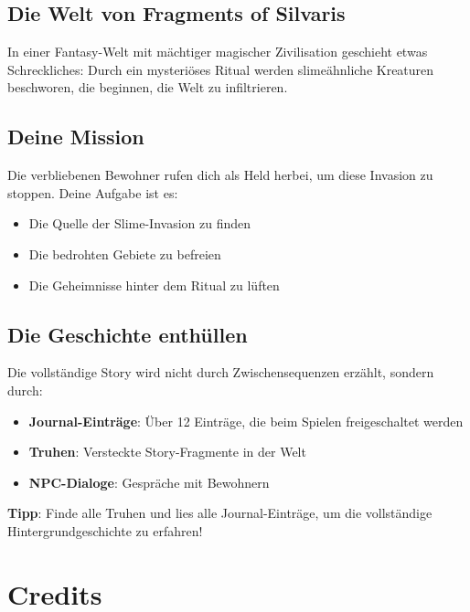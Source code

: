 \documentclass[
  a4paper,
  11pt,
  ngerman,
  parskip=half,
  bibliography=totoc,
  listof=totoc
]{scrreprt}
\begin{document}
\section{Die Welt von Fragments of Silvaris}

In einer Fantasy-Welt mit mächtiger magischer Zivilisation geschieht etwas Schreckliches: Durch ein mysteriöses Ritual werden slimeähnliche Kreaturen beschworen, die beginnen, die Welt zu infiltrieren.

\section{Deine Mission}

Die verbliebenen Bewohner rufen dich als Held herbei, um diese Invasion zu stoppen. Deine Aufgabe ist es:
\begin{itemize}
    \item Die Quelle der Slime-Invasion zu finden
    \item Die bedrohten Gebiete zu befreien
    \item Die Geheimnisse hinter dem Ritual zu lüften
\end{itemize}

\section{Die Geschichte enthüllen}

Die vollständige Story wird nicht durch Zwischensequenzen erzählt, sondern durch:
\begin{itemize}
    \item \textbf{Journal-Einträge}: Über 12 Einträge, die beim Spielen freigeschaltet werden
    \item \textbf{Truhen}: Versteckte Story-Fragmente in der Welt
    \item \textbf{NPC-Dialoge}: Gespräche mit Bewohnern
\end{itemize}

\textbf{Tipp}: Finde alle Truhen und lies alle Journal-Einträge, um die vollständige Hintergrundgeschichte zu erfahren!


\chapter{Credits}
\end{document}
